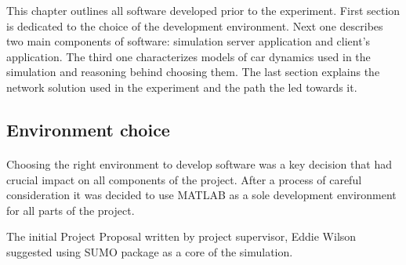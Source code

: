 \documentclass[11pt,english,twoside]{article}
\begin{document}
\par

This chapter outlines all software developed prior to the experiment. First section is dedicated to the choice of the development environment. Next one describes two main components of software: simulation server application and client's application. The third one characterizes models of car dynamics used in the simulation and reasoning behind choosing them. The last section explains the network solution used in the experiment and the path the led towards it.

\par




















\subsection{Environment choice}
\paragraph{}

Choosing the right environment to develop software was a key decision that had crucial impact on all components of the project. After a process of careful consideration it was decided to use MATLAB as a sole development environment for all parts of the project. 
\par
The initial Project Proposal written by project supervisor, Eddie Wilson suggested using SUMO package as a core of the simulation. 
\par
\end{document}
